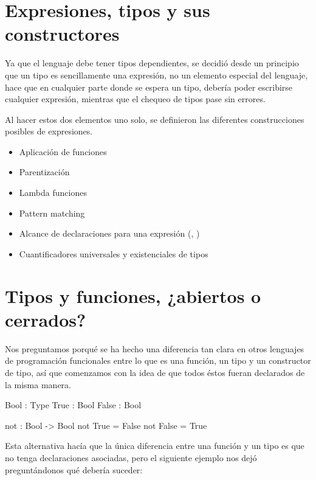 {\section{Expresiones, tipos y sus constructores}

\begin{designfr}
Ya que el lenguaje debe tener tipos dependientes, se decidió desde un principio que un tipo es sencillamente una expresión, no un elemento especial del lenguaje, hace que en cualquier parte donde se espera un tipo, debería poder escribirse cualquier expresión, mientras que el chequeo de tipos pase sin errores.

Al hacer estos dos elementos uno solo, se definieron las diferentes construcciones posibles de expresiones.

\begin{itemize}
    \item Aplicación de funciones
    \item Parentización
    \item Lambda funciones
    \item Pattern matching
    \item Alcance de declaraciones para una expresión (, )
    \item Cuantificadores universales y existenciales de tipos
\end{itemize}
\end{designfr}

\section{Tipos y funciones, ¿abiertos o cerrados?}

\begin{designfr}
Nos preguntamos porqué se ha hecho una diferencia tan clara en otros lenguajes de programación funcionales entre lo que es una función, un tipo y un constructor de tipo, así que comenzamos con la idea de que todos éstos fueran declarados de la misma manera.

\begin{anglercode}
Bool : Type
True : Bool
False : Bool

not : Bool -> Bool
not True = False
not False = True
\end{anglercode}

Esta alternativa hacía que la única diferencia entre una función y un tipo es que no tenga declaraciones asociadas, pero el siguiente ejemplo nos dejó preguntándonos qué debería suceder:


\end{designfr}}
